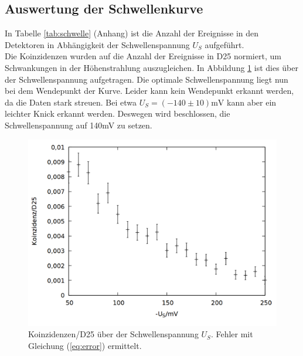 \subsection{Auswertung der Schwellenkurve}
In Tabelle \ref{tab:schwelle} (Anhang) ist die Anzahl der Ereignisse in den Detektoren in Abhängigkeit der Schwellenspannung $U_S$ aufgeführt. \\

Die Koinzidenzen wurden auf die Anzahl der Ereignisse in D25 normiert, um Schwankungen in der Höhenstrahlung auszugleichen. In Abbildung \ref{fig:schwelle} ist dies über der Schwellenspannung aufgetragen. Die optimale Schwellenspannung liegt nun bei dem Wendepunkt der Kurve. Leider kann kein Wendepunkt erkannt werden, da die Daten stark streuen. Bei etwa $U_S = (-140 \pm 10)\si{\milli \volt}$ kann aber ein leichter Knick erkannt werden. Deswegen wird beschlossen, die Schwellenspannung auf 140\si{\milli \volt} zu setzen.

\begin{figure}
\centering
\includegraphics[width=0.75\linewidth]{data/friedrich/schwelle.png}
\caption{Koinzidenzen/D25 über der Schwellenspannung $U_S$. Fehler mit Gleichung (\ref{eq:error}) ermittelt.}
\label{fig:schwelle}
\end{figure}

